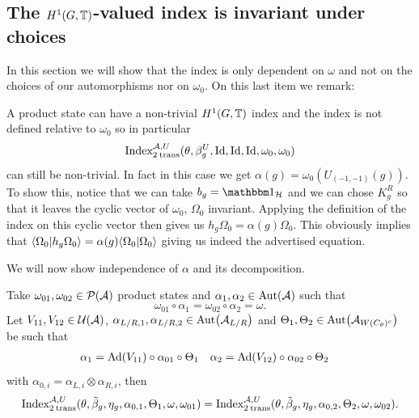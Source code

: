 \documentclass[12pt,a4paper,twoside]{article}
\numberwithin{equation}{section}
\begin{document}
\subsection{The $H^1(G,\TT)$-valued index is invariant under choices}\label{sec:IndexIsInvariantUnderChoicesTwoTranslations}
In this section we will show that the index is only dependent on $\omega$ and not on the choices of our automorphisms nor on $\omega_0$. On this last item we remark:
\begin{remark}\label{rem:NontrivialProductState}
	A product state can have a non-trivial $H^1(G,\TT)$ index and the index is not defined relative to $\omega_0$ so in particular
	\begin{equation}
		\textrm{Index}_{2\:\text{trans}}^{\AA,U}(\theta,\beta_g^U,\textrm{Id},\textrm{Id},\textrm{Id},\omega_0,\omega_0)
	\end{equation}
	can still be non-trivial. In fact in this case we get $\alpha(g)=\omega_0(U_{(-1,-1)}(g))$. To show this, notice that we can take $b_g=\id_{\HH}$ and we can chose $K_g^R$ so that it leaves the cyclic vector of $\omega_0$, $\Omega_0$ invariant. Applying the definition of the index on this cyclic vector then gives us $h_g\Omega_0=\alpha(g)\Omega_0$. This obviously implies that $\bra{\Omega_0}\ket{h_g\Omega_0}=\alpha(g)\bra{\Omega_0}\ket{\Omega_0}$ giving us indeed the advertised equation.
\end{remark}
We will now show independence of $\alpha$ and its decomposition.
\begin{lemma}
	Take $\omega_{01},\omega_{02}\in\PP(\AA)$ product states and $\alpha_1,\alpha_2\in\Aut{\AA}$ such that
	\begin{equation}
		\omega_{01}\circ\alpha_1=\omega_{02}\circ\alpha_2=\omega.
	\end{equation}
	Let $V_{11},V_{12}\in\UU(\AA)$, $\alpha_{L/R,1},\alpha_{L/R,2}\in\Aut{\AA_{L/R}}$ and $\Theta_1,\Theta_2\in \Aut{\AA_{W(C_\theta)^c}}$ be such that
	\begin{align}
		\alpha_1&=\Ad{V_{11}}\circ\alpha_{01}\circ\Theta_1&\alpha_2&=\Ad{V_{12}}\circ\alpha_{02}\circ \Theta_2
	\end{align}
	with $\alpha_{0,i}=\alpha_{L,i}\otimes\alpha_{R,i}$, then
	\begin{equation}
		\textrm{Index}_{2\:\text{trans}}^{\AA,U}(\theta,\tilde{\beta}_g,\eta_g,\alpha_{0,1},\Theta_1,\omega,\omega_{01})=\textrm{Index}_{2\:\text{trans}}^{\AA,U}(\theta,\tilde{\beta}_g,\eta_g,\alpha_{0,2},\Theta_2,\omega,\omega_{02}).
	\end{equation}
\end{lemma}
\end{document}

